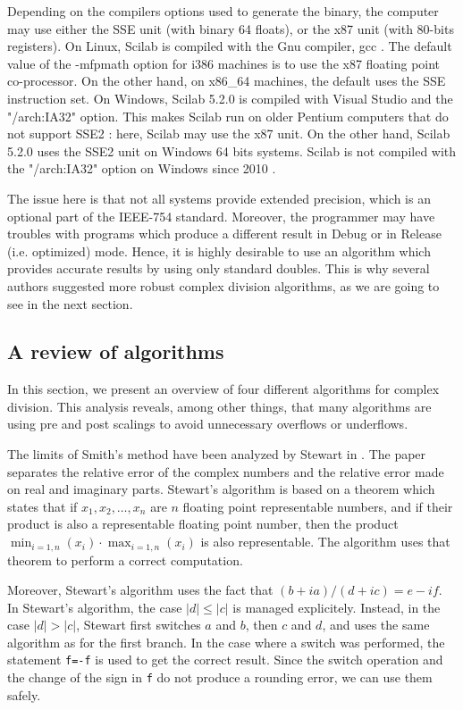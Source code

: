 \documentclass{paper}
\newcommand{\scivar}[1]{\texttt{#1}}
\begin{document}
Depending on the compilers options used to generate the binary,
the computer may use either the SSE unit (with binary 64 floats), or the 
x87 unit (with 80-bits registers). 
On Linux, Scilab is compiled with the Gnu compiler, gcc \cite{GCCManual2008}.  
The default value of the -mfpmath option for i386 machines 
is to use the x87 floating point co-processor. 
On the other hand, on x86\_64 machines, the default uses the SSE instruction set. 
On Windows, Scilab 5.2.0 is compiled with Visual Studio and the "/arch:IA32" option. 
This makes Scilab run on older Pentium computers that do not support 
SSE2 \cite{CordenKreitzerIntel2009}: here, Scilab may use the x87 unit. 
On the other hand, Scilab 5.2.0 uses the SSE2 unit on Windows 64 bits systems. 
Scilab is not compiled with the "/arch:IA32" option on Windows since 
2010 \cite{CornetARCHIA322010}.

The issue here is that not all systems provide extended precision, which is an 
optional part of the IEEE-754 standard. 
Moreover, the programmer may have troubles with programs which 
produce a different result in Debug or in Release (i.e. optimized) mode. 
Hence, it is highly desirable to use an algorithm which provides accurate results 
by using only standard doubles. 
This is why several authors suggested more robust complex division algorithms, as 
we are going to see in the next section.


\subsection{A review of algorithms}

In this section, we present an overview of four different algorithms 
for complex division. 
This analysis reveals, among other things, that many algorithms 
are using pre and post scalings to avoid unnecessary overflows or underflows. 

The limits of Smith's method have been analyzed by Stewart in \cite{214414}.
The paper separates the relative error of the complex numbers and the relative
error made on real and imaginary parts. 
Stewart's algorithm is based on a theorem which states that if $x_1,x_2, \ldots, x_n$
are $n$ floating point representable numbers, and if their product is also 
a representable floating point number, then the product 
$\min_{i=1,n}(x_i) \cdot \max_{i=1,n}(x_i)$
is also representable. 
The algorithm uses that theorem to perform a correct computation. 

Moreover, Stewart's algorithm uses the fact that $(b+ia)/(d+ic)=e-if$. 
In Stewart's algorithm, the case $|d|\leq |c|$ is managed explicitely. 
Instead, in the case $|d|>|c|$, Stewart first switches $a$ and $b$, then $c$ and $d$, 
and uses the same algorithm as for the first branch. 
In the case where a switch was performed, the statement \scivar{f=-f} is used 
to get the correct result. 
Since the switch operation and the change of the sign in \scivar{f} 
do not produce a rounding error, we can use them safely. 
\end{document}
